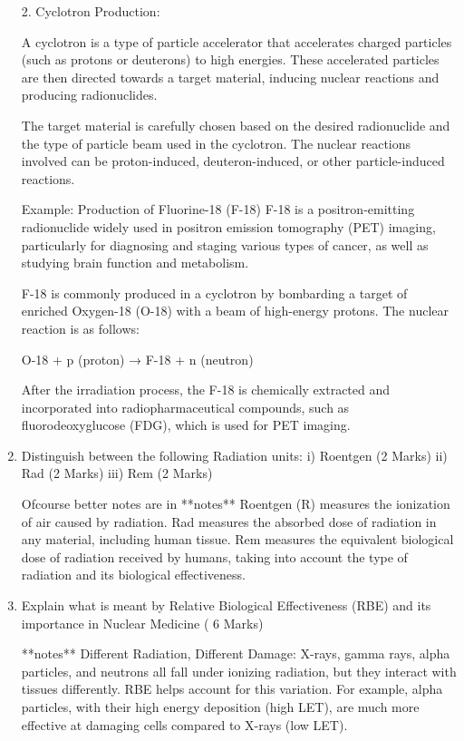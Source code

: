 \documentclass[a4paper,12pt]{article}
\begin{document}
\begin{enumerate}
2. Cyclotron Production:

A cyclotron is a type of particle accelerator that accelerates charged particles (such as protons or deuterons) to high energies. These accelerated particles are then directed towards a target material, inducing nuclear reactions and producing radionuclides.

The target material is carefully chosen based on the desired radionuclide and the type of particle beam used in the cyclotron. The nuclear reactions involved can be proton-induced, deuteron-induced, or other particle-induced reactions.

Example: Production of Fluorine-18 (F-18)
F-18 is a positron-emitting radionuclide widely used in positron emission tomography (PET) imaging, particularly for diagnosing and staging various types of cancer, as well as studying brain function and metabolism.

F-18 is commonly produced in a cyclotron by bombarding a target of enriched Oxygen-18 (O-18) with a beam of high-energy protons. The nuclear reaction is as follows:

O-18 + p (proton) → F-18 + n (neutron)

After the irradiation process, the F-18 is chemically extracted and incorporated into radiopharmaceutical compounds, such as fluorodeoxyglucose (FDG), which is used for PET imaging.

\item Distinguish between the following Radiation units:
i) Roentgen (2 Marks)
ii) Rad (2 Marks)
iii) Rem (2 Marks)

Ofcourse  better notes are in **notes**
Roentgen (R) measures the ionization of air caused by radiation.
Rad measures the absorbed dose of radiation in any material, including human tissue.
Rem measures the equivalent biological dose of radiation received by humans, taking into account the type of radiation and its biological effectiveness.
\item Explain what is meant by Relative Biological Effectiveness (RBE) and its importance in Nuclear Medicine ( 6 Marks)


**notes**
Different Radiation, Different Damage:  X-rays, gamma rays, alpha particles, and neutrons all fall under ionizing radiation, but they interact with tissues differently. RBE helps account for this variation. For example, alpha particles, with their high energy deposition (high LET), are much more effective at damaging cells compared to X-rays (low LET).


\end{enumerate}
\end{document}

